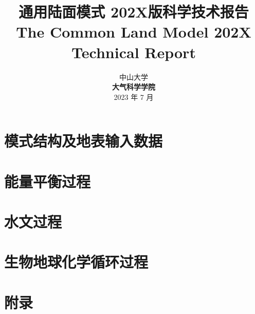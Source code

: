 \documentclass[a4paper,12pt,twoside]{report}
\begin{document}
%

\title{\huge {\bf 通用陆面模式 202X版科学技术报告}\\[3em]
\fontsize {22}{24}
\bf{ The Common Land Model 202X Technical Report }\\[3in]
\fontsize {20}{23}%
}

\author{
 \large{ 中山大学 }\\[0.1in]
 {\bf 大气科学学院}\\[1in]
 \upshape
 \large%
2023 年 7 月
}

\normallinespacing
\maketitle

\preface

%
%
%
%

\body
\part{模式结构及地表输入数据}


\part{能量平衡过程}





\part{水文过程}



\part{生物地球化学循环过程}









\part*{附录}
\appendix
\clearpage


\renewcommand{\bibname}{参考文献}


\end{document}
